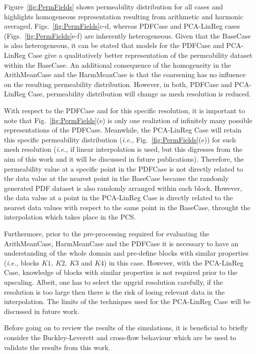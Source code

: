 \documentclass[preprint,12pt]{elsarticle}
\newcommand{\ie}{{\it i.e., }}
\begin{document}
Figure~\ref{fig:PermFields} shows permeability distribution for all cases and highlights homogeneous representation resulting from arithmetic and harmonic averaged, Figs.~\ref{fig:PermFields}c-d, whereas PDFCase and PCA-LinReg cases (Figs.~\ref{fig:PermFields}e-f) are inherently heterogeneous. Given that the BaseCase is also heterogeneous, it can be stated that models for the PDFCase and PCA-LinReg Case give a qualitatively better representation of the permeability dataset within the BaseCase. An additional consequence of the homogeneity in the ArithMeanCase and the HarmMeanCase is that the coarsening has no influence on the resulting permeability distribution. However, in both, PDFCase and PCA-LinReg Case, permeability distribution will change as mesh resolution is reduced.

\medskip
With respect to the PDFCase and for this specific resolution, it is important to note that Fig.~\ref{fig:PermFields}(e) is only one realiztion of infinitely many possible representations of the PDFCase. Meanwhile, the PCA-LinReg Case will retain this specific permeability distribution (\ie Fig.~\ref{fig:PermFields}(e)) for such mesh resolution (\ie if linear interpolation is used, but this digresses from the aim of this work and it will be discussed in future publications). Therefore, the permeability value at a specific point in the PDFCase is not directly related to the data value at the nearest point in the BaseCase because the randomly generated PDF dataset is also randomly arranged within each block. However, the data value at a point in the PCA-LinReg Case is directly related to the nearest data values with respect to the same point in the BaseCase, throught the interpolation which takes place in the PCS.

\medskip
Furthermore, prior to the pre-processing required for evaluating the ArithMeanCase, HarmMeanCase and the PDFCase it is necessary to have an understanding of the whole domain and pre-define blocks with similar properties (\ie blocks $K1,~K2,~K3$ and $K4$) in this case. However, with the PCA-LinReg Case, knowledge of blocks with similar properties is not required prior to the upscaling. Albeit, one has to select the upgrid resolution carefully, if the resolution is too large then there is the risk of losing relevant data in the interpolation. The limits of the techniques used for the PCA-LinReg Case will be discussed in future work.

Before going on to review the results of the simulations, it is beneficial to briefly consider the Buckley-Leverett and cross-flow behaviour which are be used to validate the results from this work. 
\end{document}

